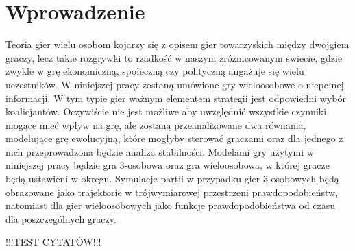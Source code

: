 \chapter{Wprowadzenie}
\label{cha:wprowadzenie}

Teoria gier wielu osobom kojarzy się z opisem gier towarzyskich między dwojgiem graczy, lecz takie rozgrywki to rzadkość w naszym zróżnicowanym świecie, gdzie zwykle w grę ekonomiczną, społeczną czy polityczną angażuje się wielu uczestników. W niniejszej pracy zostaną umówione gry wieloosobowe o niepełnej informacji. W tym typie gier ważnym elementem strategii jest odpowiedni wybór koalicjantów. Oczywiście nie jest możliwe aby uwzględnić wszystkie czynniki mogące mieć wpływ na grę, ale zostaną przeanalizowane dwa równania, modelujące grę ewolucyjną, które mogłyby sterować graczami oraz dla jednego z nich przeprowadzona będzie analiza stabilności. Modelami gry użytymi w niniejszej pracy będzie gra 3-osobowa oraz gra wieloosobowa, w której gracze będą ustawieni w okręgu. Symulacje partii w przypadku gier 3-osobowych będą obrazowane jako trajektorie w trójwymiarowej przestrzeni prawdopodobieństw, natomiast dla gier wieloosobowych jako funkcje prawdopodobieństwa od czasu dla poszczególnych graczy.


!!!TEST CYTATÓW!!! \cite{Now06} \cite{Hof98} \cite{Str01} \cite{Qt} \cite{Tut} \cite{Sss} \cite{Fsmd} \cite{Crf}